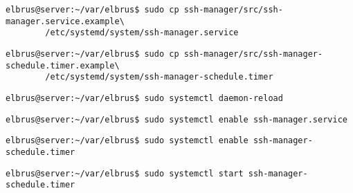 	\lstset{style=commands}
	\begin{lstlisting}[caption={Kopieren des Serviceprogrammes.}]
		elbrus@server:~/var/elbrus$ sudo cp ssh-manager/src/ssh-manager.service.example\
		/etc/systemd/system/ssh-manager.service
	\end{lstlisting}
	
	\lstset{style=commands}
	\begin{lstlisting}[caption={Kopieren des Zeitplanungsprogrammes.}]
		elbrus@server:~/var/elbrus$ sudo cp ssh-manager/src/ssh-manager-schedule.timer.example\
		/etc/systemd/system/ssh-manager-schedule.timer
	\end{lstlisting}
	
	\lstset{style=commands}
	\begin{lstlisting}[caption={Neuladen des 'systemctl' Deamons.}]
		elbrus@server:~/var/elbrus$ sudo systemctl daemon-reload
	\end{lstlisting}
	
	\lstset{style=commands}
	\begin{lstlisting}[caption={Aktivieren des Serviceprogrammes.}]
		elbrus@server:~/var/elbrus$ sudo systemctl enable ssh-manager.service
	\end{lstlisting}
	
	\lstset{style=commands}
	\begin{lstlisting}[caption={Aktivieren des Zeitplanungsprogrammes.}]
		elbrus@server:~/var/elbrus$ sudo systemctl enable ssh-manager-schedule.timer
	\end{lstlisting}
	
	\lstset{style=commands}
	\begin{lstlisting}[caption={Starten des Zeitplanungsprogrammes.}]
		elbrus@server:~/var/elbrus$ sudo systemctl start ssh-manager-schedule.timer
	\end{lstlisting}